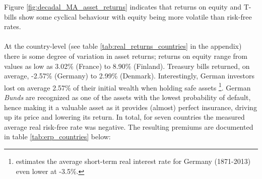 {Figure \ref{fig:decadal_MA_asset_returns} indicates that returns on equity and T-bills show some cyclical behaviour with equity being more volatile than risk-free rates.\\
\\
At the country-level (see table \ref{tab:real_returns_countries} in the appendix) there is some degree of variation in asset returns; returns on equity range from values as low as 3.02\% (France) to 8.90\% (Finland). Treasury bills returned, on average, -2.57\% (Germany) to 2.99\% (Denmark). Interestingly, German investors lost on average 2.57\% of their initial wealth when holding safe assets \footnote{\citet{Probst2019} estimates the average short-term real interest rate for Germany (1871-2013) even lower at -3.5\%.}. German \textit{Bunds} are recognized as one of the assets with the lowest probability of default, hence making it a valuable asset as it provides (almost) perfect insurance, driving up its price and lowering its return. In total, for seven countries the measured average real risk-free rate was negative.%
\newpage
The resulting premiums are documented in table \ref{tab:erp_countries} below:

}
